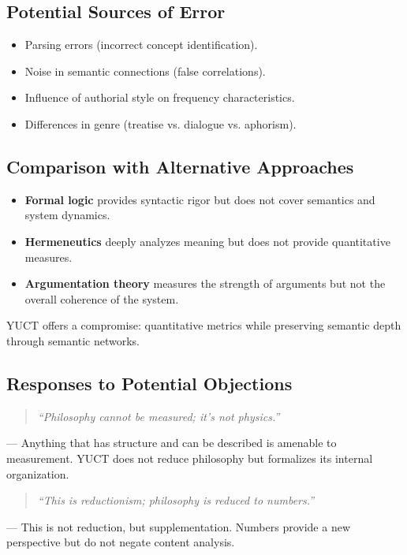\documentclass[12pt,a4paper]{article}
\begin{document}
	\subsection{Potential Sources of Error}
	
	\begin{itemize}
		\item Parsing errors (incorrect concept identification).
		\item Noise in semantic connections (false correlations).
		\item Influence of authorial style on frequency characteristics.
		\item Differences in genre (treatise vs. dialogue vs. aphorism).
	\end{itemize}
	
	\subsection{Comparison with Alternative Approaches}
	
	\begin{itemize}
		\item \textbf{Formal logic} provides syntactic rigor but does not cover semantics and system dynamics.
		\item \textbf{Hermeneutics} deeply analyzes meaning but does not provide quantitative measures.
		\item \textbf{Argumentation theory} measures the strength of arguments but not the overall coherence of the system.
	\end{itemize}
	YUCT offers a compromise: quantitative metrics while preserving semantic depth through semantic networks.
	
	\subsection{Responses to Potential Objections}
	
	\begin{quote}
		\textit{``Philosophy cannot be measured; it's not physics.''}
	\end{quote}
	— Anything that has structure and can be described is amenable to measurement. YUCT does not reduce philosophy but formalizes its internal organization.
	
	\begin{quote}
		\textit{``This is reductionism; philosophy is reduced to numbers.''}
	\end{quote}
	— This is not reduction, but supplementation. Numbers provide a new perspective but do not negate content analysis.
	
\end{document}
